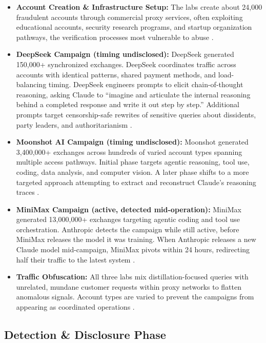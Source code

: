 \documentclass[11pt,a4paper]{article}
\begin{document}
\begin{itemize}[leftmargin=20pt, noitemsep]
    \item \textbf{Account Creation \& Infrastructure Setup:} The labs create about 24,000 fraudulent accounts through commercial proxy services, often exploiting educational accounts, security research programs, and startup organization pathways, the verification processes most vulnerable to abuse \cite{anthropic_blog}\cite{engadget}.
    \item \textbf{DeepSeek Campaign (timing undisclosed):} DeepSeek generated 150,000+ synchronized exchanges. DeepSeek coordinates traffic across accounts with identical patterns, shared payment methods, and load-balancing timing. DeepSeek engineers prompts to elicit chain-of-thought reasoning, asking Claude to ``imagine and articulate the internal reasoning behind a completed response and write it out step by step.'' Additional prompts target censorship-safe rewrites of sensitive queries about dissidents, party leaders, and authoritarianism \cite{anthropic_blog}.
    \item \textbf{Moonshot AI Campaign (timing undisclosed):} Moonshot generated 3,400,000+ exchanges across hundreds of varied account types spanning multiple access pathways. Initial phase targets agentic reasoning, tool use, coding, data analysis, and computer vision. A later phase shifts to a more targeted approach attempting to extract and reconstruct Claude's reasoning traces \cite{anthropic_blog}.
    \item \textbf{MiniMax Campaign (active, detected mid-operation):} MiniMax generated 13,000,000+ exchanges targeting agentic coding and tool use orchestration. Anthropic detects the campaign while still active, before MiniMax releases the model it was training. When Anthropic releases a new Claude model mid-campaign, MiniMax pivots within 24 hours, redirecting half their traffic to the latest system \cite{anthropic_blog}\cite{treblle}.
    \item \textbf{Traffic Obfuscation:} All three labs mix distillation-focused queries with unrelated, mundane customer requests within proxy networks to flatten anomalous signals. Account types are varied to prevent the campaigns from appearing as coordinated operations \cite{anthropic_blog}\cite{treblle}.
\end{itemize}

\subsection{Detection \& Disclosure Phase}
\end{document}
